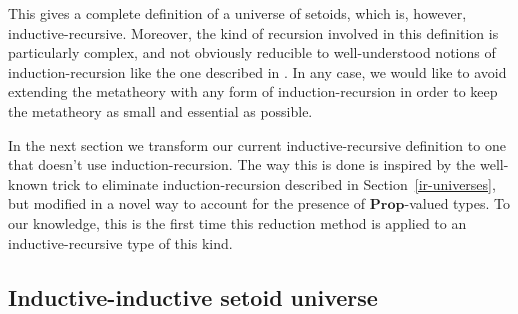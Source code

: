 \documentclass[autoref]{llncs}
\newcommand{\mProp}{\mathbf{Prop}}
\begin{document}
This gives a complete definition of a universe of setoids, which is, however,
inductive-recursive. Moreover, the kind of recursion involved in this definition
is particularly complex, and not obviously reducible to well-understood notions
of induction-recursion like the one described in \cite{dybjer-setzer}. In any
case, we would like to avoid extending the metatheory with any form of
induction-recursion in order to keep the metatheory as small and
essential as possible.

In the next section we transform our current inductive-recursive definition to
one that doesn't use induction-recursion.
%
The way this is done is inspired by the well-known trick to eliminate
induction-recursion described in Section~\ref{ir-universes}, but modified in a
novel way to account for the presence of $\mProp$-valued types. To our
knowledge, this is the first time this reduction method is applied to an
inductive-recursive type of this kind.

\subsection{Inductive-inductive setoid universe}\label{ii-universe}
\end{document}
